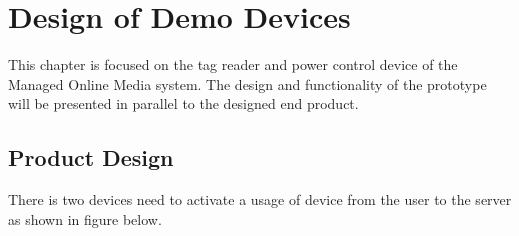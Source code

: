 \chapter{Design of Demo Devices}
This chapter is focused on the tag reader and power control device of the Managed Online Media system. \newline
The design and functionality of the prototype will be presented in parallel to the designed end product. \newline

\section{Product Design}

There is two devices need to activate a usage of device from the user to the server as shown in figure below.

